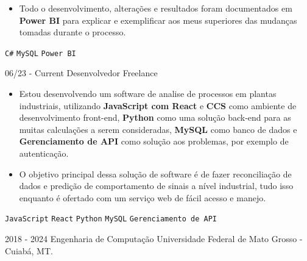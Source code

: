 \documentclass[9pt]{developercv}
\begin{document}
\begin{entrylist}
{\begin{itemize}[noitemsep,topsep=0pt,parsep=0pt,partopsep=0pt, leftmargin=-1pt]
            \vspace{0.25pt}
            \item {Todo o desenvolvimento, alterações e resultados foram documentados em \textbf{Power BI} para explicar e exemplificar aos meus superiores das mudanças tomadas durante o processo.}
        \end{itemize}
        \texttt{C\#} \slashsep \texttt{MySQL} \slashsep \texttt{Power BI}}
        \entry
		{06/23 - Current}
		{\normalsize Desenvolvedor}
		{\normalsize Freelance}
		{\vspace{-10pt}
        \vspace{0.25pt}
        \begin{itemize}[noitemsep,topsep=0pt,parsep=0pt,partopsep=0pt, leftmargin=-1pt]
            \item { Estou desenvolvendo um software de analise de processos em plantas industriais, utilizando \textbf{JavaScript com React} e \textbf{CCS} como ambiente de desenvolvimento front-end, \textbf{Python} como uma solução back-end para as muitas calculações a serem consideradas, \textbf{MySQL} como banco de dados e \textbf{Gerenciamento de API} como solução aos problemas, por exemplo de autenticação. }
            \vspace{0.25pt}
            \item {O objetivo principal dessa solução de software é de fazer reconciliação de dados e predição de comportamento de sinais a nível industrial, tudo isso enquanto é ofertado com um serviço web de fácil acesso e manejo.}
        \end{itemize} 
        \texttt{JavaScript} \slashsep \texttt{React} \slashsep \texttt{Python} \slashsep \texttt{MySQL} \slashsep \texttt{Gerenciamento de API}}
\end{entrylist}
\vspace{-10 pt}
\begin{entrylist}
    \entry
		{\normalsize 2018 - 2024}
		{\normalsize Engenharia de Computação}
		{\normalsize Universidade Federal de Mato Grosso - Cuiabá, MT.}
		{}
\end{entrylist}
\end{document}

